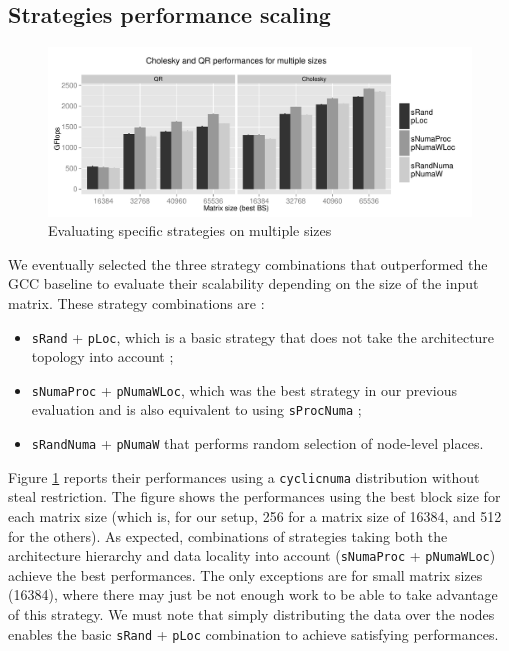 \documentclass[parallelisme]{compas2016}
\begin{document}
\subsection{Strategies performance scaling}

\begin{figure}[t]
  \centering
  \includegraphics[scale=0.5]{figures/graph_details_strat.pdf}
\caption{Evaluating specific strategies on multiple sizes}
\label{fig:eval-strat-sizes}
\end{figure}

We eventually selected the three strategy combinations that outperformed the GCC baseline to evaluate their scalability depending on the size of the input matrix.
These strategy combinations are :
\begin{itemize}
  \item \verb/sRand/ + \verb/pLoc/, which is a basic strategy that does not take the architecture topology into account ;
  \item \verb/sNumaProc/ + \verb/pNumaWLoc/, which was the best strategy in our previous
    evaluation and is also equivalent to using \verb/sProcNuma/ ;
  \item \verb/sRandNuma/ + \verb/pNumaW/ that performs random selection of node-level places.
\end{itemize}

Figure \ref{fig:eval-strat-sizes} reports their performances using a \verb/cyclicnuma/ distribution without steal restriction.
The figure shows the performances using the best block size for each matrix size (which is, for our setup, 256 for a matrix
size of 16384, and 512 for the others).
As expected, combinations of strategies taking both the architecture hierarchy and data locality into account (\verb/sNumaProc/
+ \verb/pNumaWLoc/) achieve the best performances.
The only exceptions are for small matrix sizes (16384), where there may just be
not enough work to be able to take advantage of this strategy.
We must note that simply distributing the data over the nodes enables the basic
\verb/sRand/ + \verb/pLoc/ combination to achieve satisfying performances.
\end{document}
